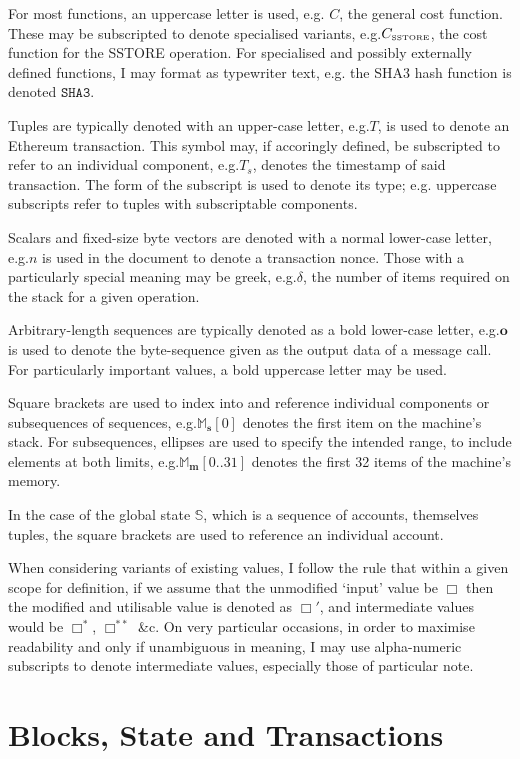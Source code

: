 \documentclass[9pt,oneside]{amsart}
\makeatletter
\newcommand*\eg{e.g.\@\xspace}
\makeatother
\begin{document}
\begin{multicols}{2}
For most functions, an uppercase letter is used, e.g. $C$, the general cost function. These may be subscripted to denote specialised variants, \eg $C_\text{\tiny SSTORE}$, the cost function for the {\tiny SSTORE} operation. For specialised and possibly externally defined functions, I may format as typewriter text, \eg the SHA3 hash function is denoted $\texttt{SHA3}$.

Tuples are typically denoted with an upper-case letter, \eg $T$, is used to denote an Ethereum transaction. This symbol may, if accoringly defined, be subscripted to refer to an individual component, \eg $T_s$, denotes the timestamp of said transaction. The form of the subscript is used to denote its type; \eg uppercase subscripts refer to tuples with subscriptable components.

Scalars and fixed-size byte vectors are denoted with a normal lower-case letter, \eg $n$ is used in the document to denote a transaction nonce. Those with a particularly special meaning may be greek, \eg $\delta$, the number of items required on the stack for a given operation.

Arbitrary-length sequences are typically denoted as a bold lower-case letter, \eg $\mathbf{o}$ is used to denote the byte-sequence given as the output data of a message call. For particularly important values, a bold uppercase letter may be used.

Square brackets are used to index into and reference individual components or subsequences of sequences, \eg $\mathbb{M}_\mathbf{s}[0]$ denotes the first item on the machine's stack. For subsequences, ellipses are used to specify the intended range, to include elements at both limits, \eg $\mathbb{M}_\mathbf{m}[0..31]$ denotes the first 32 items of the machine's memory.

In the case of the global state $\mathbb{S}$, which is a sequence of accounts, themselves tuples, the square brackets are used to reference an individual account.

When considering variants of existing values, I follow the rule that within a given scope for definition, if we assume that the unmodified `input' value be $\Box$ then the modified and utilisable value is denoted as $\Box'$, and intermediate values would be $\Box^*$,  $\Box^{**}$ \&c. On very particular occasions, in order to maximise readability and only if unambiguous in meaning, I may use alpha-numeric subscripts to denote intermediate values, especially those of particular note.

\section{Blocks, State and Transactions} \label{ch:bst}


\end{multicols}
\end{document}
